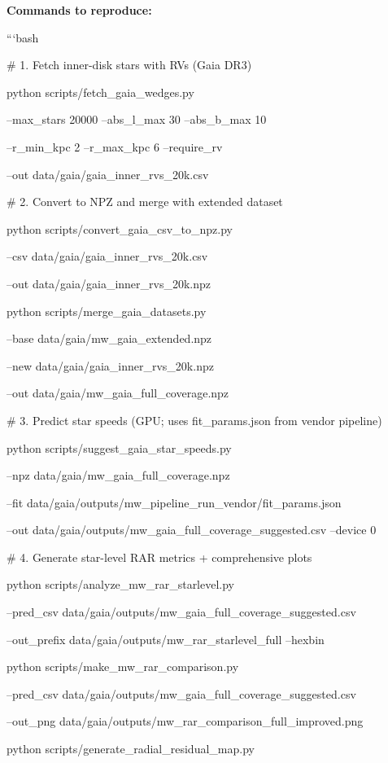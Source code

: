 \documentclass[11pt,a4paper]{article}
\begin{document}
\textbf{Commands to reproduce:}

```bash

\# 1. Fetch inner-disk stars with RVs (Gaia DR3)

python scripts/fetch\_gaia\_wedges.py \

  --max\_stars 20000 --abs\_l\_max 30 --abs\_b\_max 10 \

  --r\_min\_kpc 2 --r\_max\_kpc 6 --require\_rv \

  --out data/gaia/gaia\_inner\_rvs\_20k.csv


\# 2. Convert to NPZ and merge with extended dataset

python scripts/convert\_gaia\_csv\_to\_npz.py \

  --csv data/gaia/gaia\_inner\_rvs\_20k.csv \

  --out data/gaia/gaia\_inner\_rvs\_20k.npz


python scripts/merge\_gaia\_datasets.py \

  --base data/gaia/mw\_gaia\_extended.npz \

  --new data/gaia/gaia\_inner\_rvs\_20k.npz \

  --out data/gaia/mw\_gaia\_full\_coverage.npz


\# 3. Predict star speeds (GPU; uses fit\_params.json from vendor pipeline)

python scripts/suggest\_gaia\_star\_speeds.py \

  --npz data/gaia/mw\_gaia\_full\_coverage.npz \

  --fit data/gaia/outputs/mw\_pipeline\_run\_vendor/fit\_params.json \

  --out data/gaia/outputs/mw\_gaia\_full\_coverage\_suggested.csv --device 0


\# 4. Generate star-level RAR metrics + comprehensive plots

python scripts/analyze\_mw\_rar\_starlevel.py \

  --pred\_csv data/gaia/outputs/mw\_gaia\_full\_coverage\_suggested.csv \

  --out\_prefix data/gaia/outputs/mw\_rar\_starlevel\_full --hexbin


python scripts/make\_mw\_rar\_comparison.py \

  --pred\_csv data/gaia/outputs/mw\_gaia\_full\_coverage\_suggested.csv \

  --out\_png data/gaia/outputs/mw\_rar\_comparison\_full\_improved.png


python scripts/generate\_radial\_residual\_map.py
\end{document}
